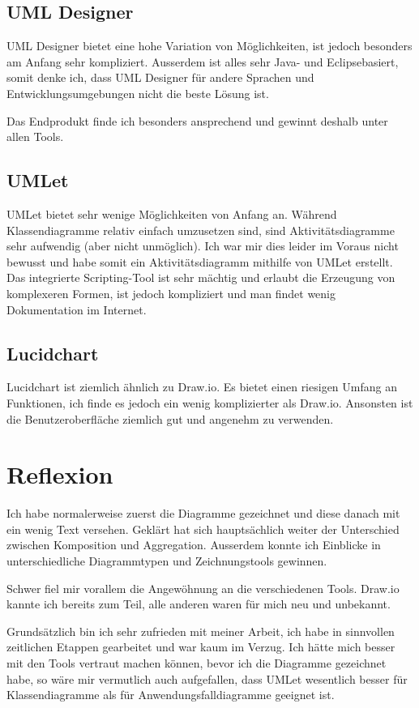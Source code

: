 \documentclass[a4paper, titlepage]{scrartcl}
\begin{document}
    \subsection{UML Designer}
    UML Designer bietet eine hohe Variation von Möglichkeiten, ist jedoch besonders
    am Anfang sehr kompliziert. Ausserdem ist alles sehr Java- und Eclipsebasiert,
    somit denke ich, dass UML Designer für andere Sprachen und Entwicklungsumgebungen
    nicht die beste Lösung ist.

    Das Endprodukt finde ich besonders ansprechend und gewinnt deshalb unter allen Tools.

    \subsection{UMLet}
    UMLet bietet sehr wenige Möglichkeiten von Anfang an. Während Klassendiagramme
    relativ einfach umzusetzen sind, sind Aktivitätsdiagramme sehr aufwendig (aber
    nicht unmöglich). Ich war mir dies leider im Voraus nicht bewusst und habe somit
    ein Aktivitätsdiagramm mithilfe von UMLet erstellt. Das integrierte Scripting-Tool
    ist sehr mächtig und erlaubt die Erzeugung von komplexeren Formen, ist jedoch
    kompliziert und man findet wenig Dokumentation im Internet.

    \subsection{Lucidchart}
    Lucidchart ist ziemlich ähnlich zu Draw.io. Es bietet einen riesigen Umfang an
    Funktionen, ich finde es jedoch ein wenig komplizierter als Draw.io. Ansonsten
    ist die Benutzeroberfläche ziemlich gut und angenehm zu verwenden.

    \section{Reflexion}
    Ich habe normalerweise zuerst die Diagramme gezeichnet und diese danach mit ein
    wenig Text versehen. Geklärt hat sich hauptsächlich weiter der Unterschied zwischen
    Komposition und Aggregation. Ausserdem konnte ich Einblicke in unterschiedliche
    Diagrammtypen und Zeichnungstools gewinnen.

    Schwer fiel mir vorallem die Angewöhnung an die verschiedenen Tools. Draw.io kannte
    ich bereits zum Teil, alle anderen waren für mich neu und unbekannt.

    Grundsätzlich bin ich sehr zufrieden mit meiner Arbeit, ich habe in sinnvollen
    zeitlichen Etappen gearbeitet und war kaum im Verzug. Ich hätte mich besser mit
    den Tools vertraut machen können, bevor ich die Diagramme gezeichnet habe, so
    wäre mir vermutlich auch aufgefallen, dass UMLet wesentlich besser für Klassendiagramme
    als für Anwendungsfalldiagramme geeignet ist.
    
\end{document}
